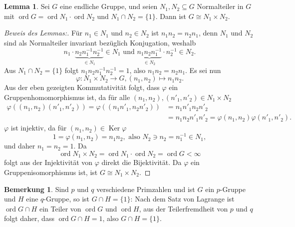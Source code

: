 \documentclass[a4paper,10pt]{article}
\theoremstyle{definition}
\newtheorem{bem}[beh]{Bemerkung}
\newtheorem{lem}[beh]{Lemma}
\newcommand{\ord}{\operatorname{ord}}
\newcommand{\Ker}{\operatorname{Ker}}
\begin{document}
\section{}
\begin{lem}\label{lem:normalprodukt}
 Sei $G$ eine endliche Gruppe, und seien $N_1, N_2 \subseteq G$ Normalteiler in $G$ mit $\ord G = \ord N_1 \cdot \ord N_2$ und $N_1 \cap N_2 = \{1\}$. Dann ist $G \cong N_1 \times N_2$.
\end{lem}
\begin{proof}[Beweis des Lemmas:]
 Für $n_1 \in N_1$ und $n_2 \in N_2$ ist $n_1 n_2 = n_2 n_1$, denn $N_1$ und $N_2$ sind als Normalteiler invariant bezüglich Konjugation, weshalb
 \[
  n_1 \cdot \underbrace{n_2 n_1^{-1} n_2^{-1}}_{\in N_1} \in N_1 \text{ und }
  \underbrace{n_1 n_2 n_1^{-1}}_{\in N_2} \cdot n_2^{-1} \in N_2.
 \]
 Aus $N_1 \cap N_2 = \{1\}$ folgt $n_1 n_2 n_1^{-1} n_2^{-1} = 1$, also $n_1 n_2 = n_2 n_1$. Es sei nun
 \[
  \varphi : N_1 \times N_2 \rightarrow G, (n_1, n_2) \mapsto n_1 n_2.
 \]
 Aus der eben gezeigten Kommutativität folgt, dass $\varphi$ ein Gruppenhomomorphismus ist, da für alle $(n_1,n_2), (n'_1, n'_2) \in N_1 \times N_2$
 \begin{align*}
  \varphi( (n_1,n_2) (n'_1, n'_2) )
  = \varphi( (n_1 n'_1, n_2 n'_2) )
  &= n_1 n'_1 n_2 n'_2 \\
  &= n_1 n_2 n'_1 n'_2
  = \varphi(n_1, n_2) \varphi(n'_1, n'_2).
 \end{align*}
 $\varphi$ ist injektiv, da für $(n_1, n_2) \in \Ker \varphi$
 \[
  1 = \varphi(n_1, n_2) = n_1 n_2, \text{ also } N_2 \ni n_2 = n_1^{-1} \in N_1,
 \]
und daher $n_1 = n_2 = 1$. Da
 \[
  \ord N_1 \times N_2 = \ord N_1 \cdot \ord N_2 = \ord G < \infty
 \]
 folgt aus der Injektivität von $\varphi$ direkt die Bijektivität. Da $\varphi$ ein Gruppenisomorphismus ist, ist $G \cong N_1 \times N_2$.
\end{proof}

\begin{bem}\label{bem:primschnitt}
 Sind $p$ und $q$ verschiedene Primzahlen und ist $G$ ein $p$-Gruppe und $H$ eine $q$-Gruppe, so ist $G \cap H = \{1\}$: Nach dem Satz von Lagrange ist $\ord G \cap H$ ein Teiler von $\ord G$ und $\ord H$, aus der Teilerfremdheit von $p$ und $q$ folgt daher, dass $\ord G \cap H = 1$, also $G \cap H = \{1\}$.
\end{bem}
\end{document}

